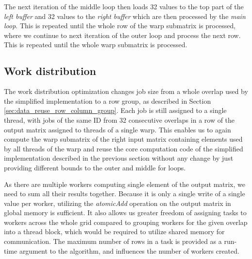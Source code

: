 The next iteration of the middle loop then loads 32 values to the top part of the \textit{left buffer} and 32 values to the \textit{right buffer} which are then processed by the \textit{main loop}. This is repeated until the whole row of the warp submatrix is processed, where we continue to next iteration of the outer loop and process the next row. This is repeated until the whole warp submatrix is processed.

\subsection{Work distribution}
\label{sec:warp_shuffle_work_dist}

The work distribution optimization changes job size from a whole overlap used by the simplified implementation to a row group, as described in Section \ref{sec:data_reuse_row_column_group}. Each job is still assigned to a single thread, with jobs of the same ID from 32 consecutive overlaps in a row of the output matrix assigned to threads of a single warp. This enables us to again compute the warp submatrix of the right input matrix containing elements used by all threads of the warp and reuse the core computation code of the simplified implementation described in the previous section without any change by just providing different bounds to the outer and middle for loops. 

As there are multiple workers computing single element of the output matrix, we need to sum all their results together. Because it is only a single write of a single value per worker, utilizing the \textit{atomicAdd} operation on the output matrix in global memory is sufficient. It also allows us greater freedom of assigning tasks to workers across the whole grid compared to grouping workers for the given overlap into a thread block, which would be required to utilize shared memory for communication. The maximum number of rows in a task is provided as a run-time argument to the algorithm, and influences the number of workers created.


